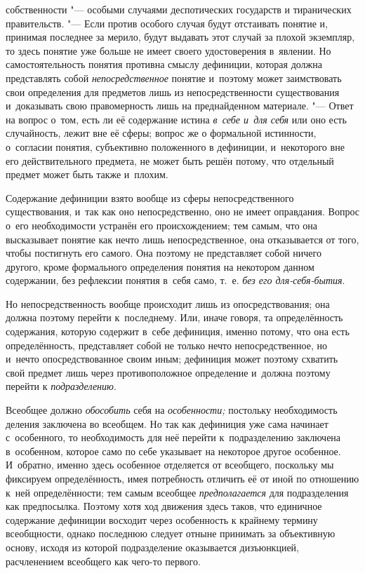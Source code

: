 собственности "--- особыми случаями деспотических государств и
тиранических правительств. "--- Если против особого случая
будут отстаивать понятие и, принимая последнее за мерило, будут выдавать
этот случай за плохой экземпляр, то здесь понятие уже больше не имеет
своего удостоверения в~явлении. Но самостоятельность понятия противна
смыслу дефиниции, которая должна представлять собой
{\em непосредственное}
понятие и~поэтому может заимствовать свои определения для
предметов лишь из непосредственности существования и~доказывать свою
правомерность лишь на преднайденном материале. "--- Ответ на
вопрос о~том, есть ли её содержание истина
{\em в~себе и~для себя}
или оно есть случайность, лежит вне её сферы; вопрос же о
формальной истинности, о~согласии понятия, субъективно положенного в
дефиниции, и~некоторого вне его действительного предмета, не может быть
решён потому, что отдельный предмет может быть также и~плохим.

Содержание дефиниции взято вообще из сферы непосредственного
существования, и~так как оно непосредственно, оно не имеет оправдания.
Вопрос о~его необходимости устранён его происхождением; тем самым, что она
высказывает понятие как нечто лишь непосредственное, она отказывается от
того, чтобы постигнуть его самого. Она поэтому не представляет собой ничего
другого, кроме формального определения понятия на некотором данном
содержании, без рефлексии понятия в~себя само, т.~е.
{\em без его для-себя-бытия}.

Но непосредственность вообще происходит лишь из
опосредствования; она должна поэтому перейти к~последнему. Или,
иначе говоря, та определённость содержания, которую содержит
в~себе дефиниция, именно потому, что она есть определённость, представляет
собой не только нечто непосредственное, но и~нечто опосредствованное своим
иным; дефиниция может поэтому схватить свой предмет лишь через
противоположное определение и~должна поэтому перейти к
{\em подразделению}.


Всеобщее должно {\em обособить} себя на {\em особенности;}
постольку необходимость деления заключена во всеобщем. Но так
как дефиниция уже сама начинает с~особенного, то необходимость для неё
перейти к~подразделению заключена в~особенном, которое само по себе
указывает на некоторое другое особенное. И~обратно, именно здесь особенное
отделяется от всеобщего, поскольку мы фиксируем определённость, имея
потребность отличить её от иной по отношению к~ней определённости; тем
самым всеобщее {\em предполагается}
для подразделения как предпосылка. Поэтому хотя ход движения
здесь таков, что единичное содержание дефиниции восходит через особенность
к крайнему термину всеобщности, однако последнюю следует отныне принимать
за объективную основу, исходя из которой подразделение оказывается
дизъюнкцией, расчленением всеобщего как чего-то первого.

